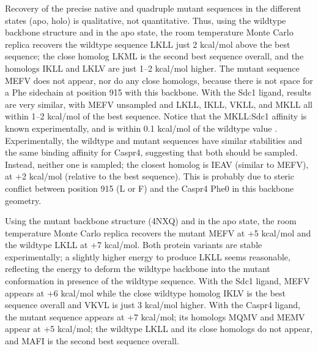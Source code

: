 \documentclass[12pt]{article}
\begin{document}
Recovery of the precise native and quadruple mutant sequences in the different states (apo, holo) is qualitative, not quantitative.
Thus, using the wildtype backbone structure and in the apo state, the room temperature Monte Carlo replica recovers the wildtype
sequence LKLL just 2 kcal/mol above the best sequence; the close homolog LKML is the second best sequence overall, and the homologs
IKLL and LKLV are just 1--2 kcal/mol higher. The mutant sequence MEFV does not appear, nor do any close homologs, because there
is not space for a Phe sidechain at position 915 with this backbone. With the Sdc1 ligand, results are very similar, with MEFV
unsampled and LKLL, IKLL, VKLL, and MKLL all within 1--2 kcal/mol of the best sequence. Notice that the MKLL:Sdc1 affinity is
known experimentally, and is within 0.1 kcal/mol of the wildtype value \cite{Sheperd11}. Experimentally, the wildtype and mutant
sequences have similar stabilities and the same binding affinity for Caspr4, suggesting that both should be sampled. Instead,
neither one is sampled; the closest homolog is IEAV (similar to MEFV), at +2 kcal/mol (relative to the best sequence). This is
probably due to steric conflict between position 915 (L or F) and the Caspr4 Phe0 in this backbone geometry.

Using the mutant backbone structure (4NXQ) and in the apo state, the room temperature Monte Carlo replica recovers the mutant MEFV
at +5 kcal/mol and the wildtype LKLL at +7 kcal/mol. Both protein variants are stable experimentally; a slightly higher energy to
produce LKLL seems reasonable, reflecting the energy to deform the wildtype backbone into the mutant conformation in presence of
the wildtype sequence. With the Sdc1 ligand, MEFV appears at +6 kcal/mol while the close wildtype homolog IKLV is the best sequence
overall and VKVL is just 3 kcal/mol higher. With the Caspr4 ligand, the mutant sequence appears at +7 kcal/mol; its homologs MQMV
and MEMV appear at +5 kcal/mol; the wildtype LKLL and its close homologs do not appear, and MAFI is the second best sequence overall.
\end{document}

